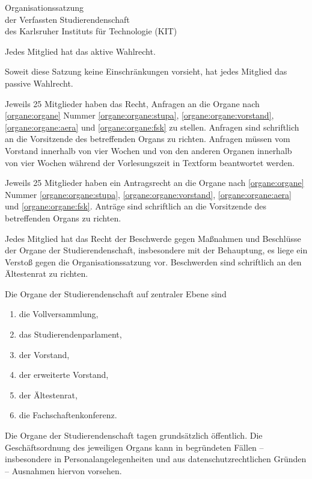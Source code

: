 \begin{jurdoc}[Organisationssatzung]{Organisationssatzung\\der Verfassten Studierendenschaft\\des Karlsruher Instituts für Technologie (KIT)}
\label{studierendenschaft:mitglieder}

Jedes Mitglied hat das aktive Wahlrecht.

Soweit diese Satzung keine Einschränkungen vorsieht, hat jedes Mitglied das passive Wahlrecht.

Jeweils 25 Mitglieder haben das Recht, Anfragen an die Organe nach \ref{organe:organe} Nummer \ref{organe:organe:stupa}, \ref{organe:organe:vorstand}, \ref{organe:organe:aera} und \ref{organe:organe:fsk} zu stellen. Anfragen sind schriftlich an die Vorsitzende des betreffenden Organs zu richten.
Anfragen müssen vom Vorstand innerhalb von vier Wochen und von den anderen Organen innerhalb von vier Wochen während der Vorlesungszeit in Textform beantwortet werden.\label{studierendenschaft:mitglieder:anfragen}

Jeweils 25 Mitglieder haben ein Antragsrecht an die Organe nach \ref{organe:organe} Nummer \ref{organe:organe:stupa}, \ref{organe:organe:vorstand}, \ref{organe:organe:aera} und \ref{organe:organe:fsk}. Anträge sind schriftlich an die Vorsitzende des betreffenden Organs zu richten.\label{studierendenschaft:mitglieder:antraege}

Jedes Mitglied hat das Recht der Beschwerde gegen Maßnahmen und Beschlüsse der Organe der Studierendenschaft, insbesondere mit der Behauptung, es liege ein Verstoß gegen die Organisationssatzung vor. Beschwerden sind schriftlich an den Ältestenrat zu richten. \label{studierendenschaft:mitglieder:beschwerden}


Die Organe der Studierendenschaft auf zentraler Ebene sind \label{organe:organe}
\begin{enumerate}
\item die Vollversammlung,
\item das Studierendenparlament, \label{organe:organe:stupa}
\item der Vorstand, \label{organe:organe:vorstand}
\item der erweiterte Vorstand,
\item der Ältestenrat, \label{organe:organe:aera}
\item die Fachschaftenkonferenz. \label{organe:organe:fsk}
\end{enumerate}

Die Organe der Studierendenschaft tagen grundsätzlich öffentlich. Die Geschäftsordnung des jeweiligen Organs kann in begründeten Fällen -- insbesondere in Personalangelegenheiten und aus datenschutzrechtlichen Gründen -- Ausnahmen hiervon vorsehen.


\end{jurdoc}
